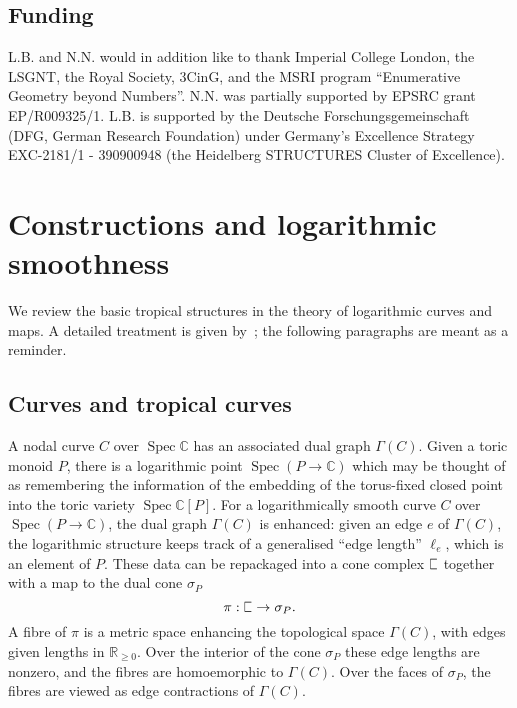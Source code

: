 \documentclass[11pt]{amsart}
\newcommand{\plC}{\scalebox{0.8}[1.3]{$\sqsubset$}}
\renewcommand{\to}{\rightarrow}
\newcommand{\CC}{\mathbb{C}}
\newcommand{\RR}{\mathbb{R}}
\DeclareMathOperator{\spec}{Spec}
\theoremstyle{definition}
\theoremstyle{definition}
\begin{document}
\subsection*{Funding} L.B. and N.N. would in addition like to thank Imperial College London, the LSGNT, the Royal Society, 3CinG, and the MSRI program ``Enumerative Geometry beyond Numbers''. N.N. was partially supported by EPSRC grant EP/R009325/1.  L.B. is supported by the Deutsche Forschungsgemeinschaft (DFG, German Research Foundation) under Germany’s Excellence Strategy EXC-2181/1 - 390900948 (the Heidelberg STRUCTURES Cluster of Excellence).


\section{Constructions and logarithmic smoothness}\label{section construction}
\noindent We review the basic tropical structures in the theory of logarithmic curves and maps. A detailed treatment is given by~\cite[Section~3]{CavalieriChanUlirschWise}; the following paragraphs are meant as a reminder. 

\subsection{Curves and tropical curves} A nodal curve $C$ over $\spec \mathbb C$ has an associated dual graph $\Gamma(C)$. Given a toric monoid $P$, there is a logarithmic point $\spec (P \to \CC)$ which may be thought of as remembering the information of the embedding of the torus-fixed closed point into the toric variety $\spec \mathbb C[P]$. For a logarithmically smooth curve $C$ over $\spec (P \to \CC)$, the dual graph $\Gamma(C)$ is enhanced: given an edge $e$ of $\Gamma(C)$, the logarithmic structure keeps track of a generalised ``edge length'' $\ell_e$, which is an element of $P$. These data can be repackaged into a cone complex $\plC$ together with a map to the dual cone $\sigma_P$
\[
\pi: \plC\to \sigma_P.
\]
A fibre of $\pi$ is a metric space enhancing the topological space $\Gamma(C)$, with edges given lengths in $\RR_{\geq 0}$. Over the interior of the cone $\sigma_P$ these edge lengths are nonzero, and the fibres are homoemorphic to $\Gamma(C)$. Over the faces of $\sigma_P$, the fibres are viewed as edge contractions of $\Gamma(C)$. 
\end{document}
